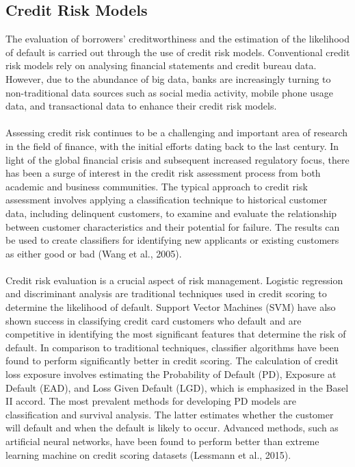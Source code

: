\subsection{Credit Risk Models}
The evaluation of borrowers' creditworthiness and the estimation of the likelihood of default is carried out 
through the use of credit risk models. Conventional credit risk models rely on analysing financial statements
and credit bureau data. However, due to the abundance of big data, banks are increasingly turning to non-traditional
data sources such as social media activity, mobile phone usage data, and transactional data to enhance their
credit risk models.\\\\
Assessing credit risk continues to be a challenging and important area of research in the field of finance, with
the initial efforts dating back to the last century. In light of the global financial crisis and subsequent
increased regulatory focus, there has been a surge of interest in the credit risk assessment process from both
academic and business communities. The typical approach to credit risk assessment involves applying a
classification technique to historical customer data, including delinquent customers, to examine and
evaluate the relationship between customer characteristics and their potential for failure. The results can
be used to create classifiers for identifying new applicants or existing customers as either good or bad
(Wang et al., 2005).\\\\
Credit risk evaluation is a crucial aspect of risk management. Logistic regression and discriminant analysis are
traditional techniques used in credit scoring to determine the likelihood of default. Support Vector Machines
(SVM) have also shown success in classifying credit card customers who default and are competitive in identifying
the most significant features that determine the risk of default. In comparison to traditional techniques,
classifier algorithms have been found to perform significantly better in credit scoring. The calculation of
credit loss exposure involves estimating the Probability of Default (PD), Exposure at Default (EAD), and Loss
Given Default (LGD), which is emphasized in the Basel II accord. The most prevalent methods for developing PD
models are classification and survival analysis. The latter estimates whether the customer will default and
when the default is likely to occur. Advanced methods, such as artificial neural networks, have been found
to perform better than extreme learning machine on credit scoring datasets (Lessmann et al., 2015).\\\\
